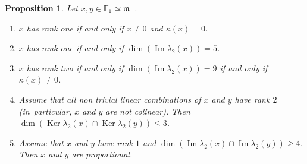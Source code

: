 \documentclass[JEP,XML,SOM,Unicode,NoFloatCountersInSection]{cedram}
\newenvironment{enumeratea}
{\bgroup\def\theenumi{\alph{enumi}}\begin{enumerate}}
{\end{enumerate}\egroup}
\theoremstyle{plain}
\newtheorem{prop}[theo]{Proposition}
\theoremstyle{definition}
\DeclareMathOperator{\im}{Im}\let\Im\im
\DeclareMathOperator{\Ker}{Ker}
\newcommand{\bE}{\mathbb{E}}
\newcommand{\fm}{\mathfrak{m}}
\renewcommand{\iff}{if and only if }
\begin{document}
\begin{prop}
\label{prop:fu-}
Let $x,y \in \bE_1 \simeq \fm^-$.
\begin{enumeratea}
\item\label{prop:fu-a} $x$ has rank one \iff $x \neq 0$ and $\kappa(x) = 0$.
\item\label{prop:fu-b} $x$ has rank one \iff $\dim \left (\im \lambda_2(x) \right) =5$.
\item\label{prop:fu-c} $x$ has rank two \iff $\dim \left (\im \lambda_2(x) \right) =9$ \iff $\kappa(x) \neq 0$.
\item\label{prop:fu-d} Assume that all non trivial linear combinations of $x$ and $y$ have rank $2$ (in~particular,
$x$ and $y$ are not colinear). Then
$\dim (\Ker \lambda_2(x) \cap \Ker \lambda_2(y)) \leq 3$.
\item\label{prop:fu-e} Assume that $x$ and $y$ have rank $1$ and $\dim (\im \lambda_2(x) \cap \im \lambda_2(y)) \geq 4$.
Then $x$ and $y$ are proportional.
\end{enumeratea}
\end{prop}
\end{document}
